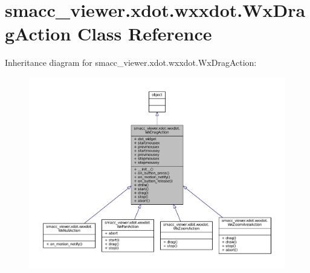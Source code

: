 \hypertarget{classsmacc__viewer_1_1xdot_1_1wxxdot_1_1WxDragAction}{}\section{smacc\+\_\+viewer.\+xdot.\+wxxdot.\+Wx\+Drag\+Action Class Reference}
\label{classsmacc__viewer_1_1xdot_1_1wxxdot_1_1WxDragAction}


Inheritance diagram for smacc\+\_\+viewer.\+xdot.\+wxxdot.\+Wx\+Drag\+Action\+:
\nopagebreak
\begin{figure}[H]
\begin{center}
\leavevmode
\includegraphics[width=350pt]{classsmacc__viewer_1_1xdot_1_1wxxdot_1_1WxDragAction__inherit__graph}
\end{center}
\end{figure}


